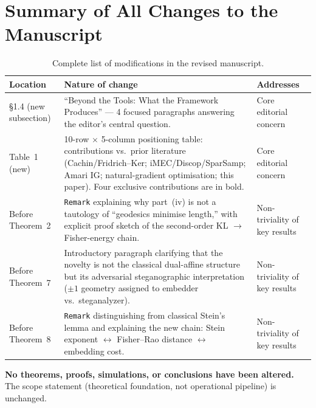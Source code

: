 \documentclass[12pt,a4paper]{article}
\begin{document}
\section{Summary of All Changes to the Manuscript}

\begin{table}[h!]
\centering
\caption{Complete list of modifications in the revised manuscript.}
\label{tab:changes}
\small
\renewcommand{\arraystretch}{1.35}
\begin{tabularx}{\linewidth}{p{3.2cm} X p{4.2cm}}
\toprule
\textbf{Location} & \textbf{Nature of change} & \textbf{Addresses} \\
\midrule
\S1.4 (new subsection)
  & ``Beyond the Tools: What the Framework Produces'' ---
    4 focused paragraphs answering the editor's central question.
  & Core editorial concern \\
Table~1 (new)
  & 10-row $\times$ 5-column positioning table: contributions vs.\ prior
    literature (Cachin/Fridrich--Ker; iMEC/Discop/SparSamp; Amari IG;
    natural-gradient optimisation; this paper).
    Four exclusive contributions are in bold.
  & Core editorial concern \\
Before Theorem~2
  & \texttt{Remark} explaining why part~(iv) is not a tautology of
    ``geodesics minimise length,'' with explicit proof sketch of the
    second-order KL $\to$ Fisher-energy chain.
  & Non-triviality of key results \\
Before Theorem~7
  & Introductory paragraph clarifying that the novelty is not the classical
    dual-affine structure but its adversarial steganographic interpretation
    ($\pm1$ geometry assigned to embedder vs.\ steganalyzer).
  & Non-triviality of key results \\
Before Theorem~8
  & \texttt{Remark} distinguishing from classical Stein's lemma and
    explaining the new chain: Stein exponent $\leftrightarrow$ Fisher--Rao
    distance $\leftrightarrow$ embedding cost.
  & Non-triviality of key results \\
\bottomrule
\end{tabularx}
\end{table}

\noindent
\textbf{No theorems, proofs, simulations, or conclusions have been altered.}
The scope statement (theoretical foundation, not operational pipeline) is
unchanged.
\end{document}
